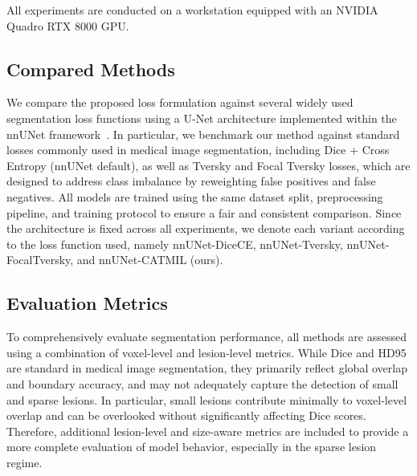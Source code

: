 All experiments are conducted on a workstation equipped with an NVIDIA
Quadro RTX 8000 GPU.

\subsection{Compared Methods}


We compare the proposed loss formulation against several widely used
segmentation loss functions using a U-Net architecture implemented
within the nnUNet framework~\cite{isensee_nnu-net_2021}. In
particular, we benchmark our method against standard losses commonly
used in medical image segmentation, including Dice + Cross Entropy
(nnUNet default), as well as Tversky and Focal Tversky losses,
which are designed to address class imbalance by reweighting false
positives and false negatives. All models are trained using the same
dataset split, preprocessing pipeline, and training protocol to ensure
a fair and consistent comparison. Since the architecture is fixed across all experiments, we denote each
variant according to the loss function used, namely
nnUNet-DiceCE, nnUNet-Tversky,
nnUNet-FocalTversky, and nnUNet-CATMIL (ours).

\subsection{Evaluation Metrics}

To comprehensively evaluate segmentation performance, all methods are
assessed using a combination of voxel-level and lesion-level metrics.
While Dice and HD95 are standard in medical image segmentation, they
primarily reflect global overlap and boundary accuracy, and may not
adequately capture the detection of small and sparse lesions. In
particular, small lesions contribute minimally to voxel-level overlap and
can be overlooked without significantly affecting Dice scores.
Therefore, additional lesion-level and size-aware metrics are included
to provide a more complete evaluation of model behavior, especially in
the sparse lesion regime.

